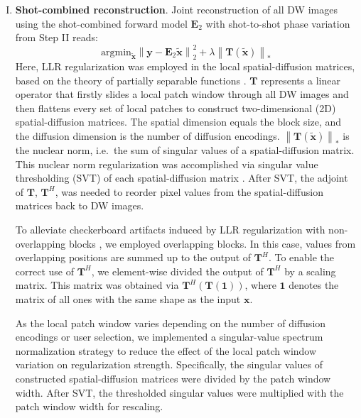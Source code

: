 \documentclass[preprint,12pt,authoryear,review]{elsarticle}
\begin{document}
\begin{enumerate}[I.]
        \item \textbf{Shot-combined reconstruction}.
        Joint reconstruction of all DW images using
        the shot-combined forward model $\mathbf{E}_2$
        with shot-to-shot phase variation from Step II reads:
        \begin{equation}
            \mathrm{argmin}_\mathbf{\tilde{x}} \left\| \mathbf{y} - \mathbf{E}_2 \mathbf{\tilde{x}} \right\|_2^2
            + \lambda \left\| \mathbf{T} ( \mathbf{\tilde{x}} ) \right\|_*
            \label{EQU:solve_dwi}
        \end{equation}
    	Here, LLR regularization was employed in the local spatial-diffusion matrices,
    	based on the theory of partially separable functions
    	\citep{liang_2007_psf,trzasko_2011_lr,zhang_2015_llr}.
    	$\mathbf{T}$ represents a linear operator that
        firstly slides a local patch window
    	through all DW images and then
    	flattens every set of local patches
    	to construct two-dimensional (2D) spatial-diffusion matrices.
        The spatial dimension equals the block size,
        and the diffusion dimension is the number of diffusion encodings.
        $\left\| \mathbf{T} ( \mathbf{\tilde{x}} ) \right\|_*$
        is the nuclear norm, i.e.~the sum of singular values
        of a spatial-diffusion matrix.
    	This nuclear norm regularization was accomplished via
    	singular value thresholding (SVT) of each spatial-diffusion matrix
        \citep{cai_2010_svt}.
        After SVT, the adjoint of $\mathbf{T}$, $\mathbf{T}^H$,
        was needed to reorder
        pixel values from the spatial-diffusion matrices
        back to DW images.

        To alleviate checkerboard artifacts induced
        by LLR regularization with non-overlapping blocks
        \citep{hu_2020_spa_llr},
        we employed overlapping blocks.
        In this case, values from overlapping positions are summed up
        to the output of $\mathbf{T}^H$.
        To enable the correct use of $\mathbf{T}^H$,
        we element-wise divided the output of $\mathbf{T}^H$
        by a scaling matrix. This matrix was obtained via
        $\mathbf{T}^H (\mathbf{T}(\mathbf{1}))$,
        where $\mathbf{1}$ denotes the matrix of all ones
    	with the same shape as the input $\mathbf{x}$.

        As the local patch window varies depending on
        the number of diffusion encodings or user selection,
        we implemented a singular-value spectrum normalization strategy
        to reduce the effect of the local patch window variation
        on regularization strength.
        Specifically, the singular values of
        constructed spatial-diffusion matrices
        were divided by the patch window width.
        After SVT, the thresholded singular values
        were multiplied with the patch window width for rescaling.

    \end{enumerate}
\end{document}
